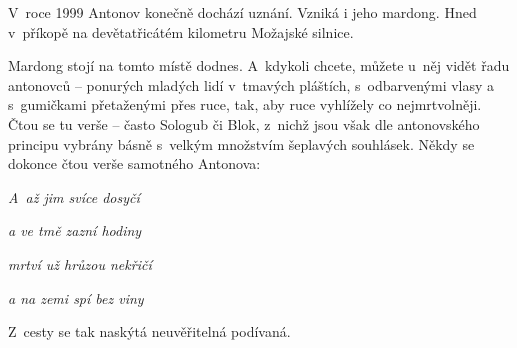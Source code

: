 \begin{pairs}
\begin{Rightside}
\pstart
V~roce 1999 Antonov konečně dochází uznání. Vzniká i jeho mardong. Hned v~příkopě na devětatřicátém kilometru Možajské silnice.

Mardong stojí na tomto místě dodnes. A~kdykoli chcete, můžete u~něj vidět řadu antonovců -- ponurých mladých lidí v~tmavých pláštích, s~odbarvenými vlasy a s~gumičkami přetaženými přes ruce, tak, aby ruce vyhlížely co nejmrtvolněji. Čtou se tu verše -- často Sologub či Blok, z~nichž jsou však dle antonovského principu vybrány básně s~velkým množstvím šeplavých souhlásek. Někdy se dokonce čtou verše samotného Antonova:
\pend

\pstart
\textit{A~až jim svíce dosyčí}

\textit{a ve tmě zazní hodiny}

\textit{mrtví už hrůzou nekřičí}

\textit{a na zemi spí bez viny}
\pend

\pstart
Z~cesty se tak naskýtá neuvěřitelná podívaná.
\pend
\endnumbering
\end{Rightside}

\Columns
\end{pairs}
